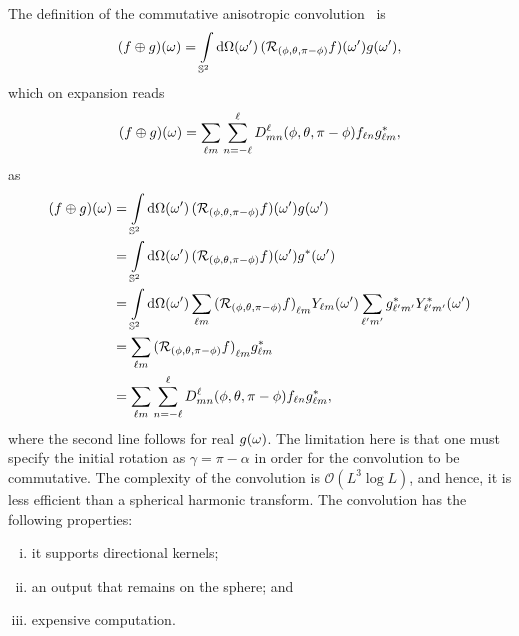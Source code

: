 The definition of the commutative anisotropic convolution~\cite{Sadeghi2012,Khalid2012} is
%
\begin{equation}
	\pixel{(f \oplus g)}
	= \integrateSphere{\omega'} \pixel[']{(\rotation{(\phi,\theta,\pi-\phi)}f)} \pixel[']{g},
\end{equation}
%
which on expansion reads
%
\begin{equation}
	\pixel{(f \oplus g)}
	= \harmonicSum \wignerSum \wigner{\ell}{m}{n}(\phi,\theta,\pi-\phi) f_{\ell n} \conj{\harmonic{g}},
\end{equation}
%
as
%
\begin{align}
	\pixel{(f \oplus g)}
	 & = \integrateSphere{\omega'} \pixel[']{(\rotation{(\phi,\theta,\pi-\phi)}f)} \pixel[']{g} \nonumber{}                                                                                                  \\
	 & = \integrateSphere{\omega'} \pixel[']{(\rotation{(\phi,\theta,\pi-\phi)}f)} \pixel[']{\conj{g}} \nonumber{}                                                                                                  \\
	 & = \integrateSphere{\omega'} \harmonicSum \harmonic{(\rotation{(\phi,\theta,\pi-\phi)}f)} \pixel[']{\harmonic{Y}} \harmonicSum['] \conj{\harmonic[']{g}} \pixel[']{\conj{\harmonic[']{Y}}} \nonumber{} \\
	 & = \harmonicSum \harmonic{(\rotation{(\phi,\theta,\pi-\phi)}f)} \conj{\harmonic{g}} \nonumber{}                                                                                                        \\
	 & = \harmonicSum \wignerSum \wigner{\ell}{m}{n}(\phi,\theta,\pi-\phi) f_{\ell n} \conj{\harmonic{g}},
\end{align}
%
where the second line follows for real \(\pixel{g}\).
The limitation here is that one must specify the initial rotation as \({\gamma=\pi-\alpha}\) in order for the convolution to be commutative.
The complexity of the convolution is \(\mathcal{O}(L^{3}\log{L})\), and hence, it is less efficient than a spherical harmonic transform.
The convolution has the following properties:
%
\begin{enumerate}[(i),nosep,left=\parindent]
	\item it supports directional kernels;
	\item an output that remains on the sphere; and
	\item expensive computation.
\end{enumerate}


